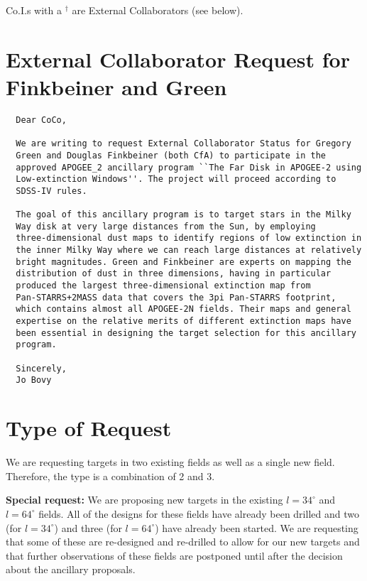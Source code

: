 \documentclass[12pt,preprint]{aastex}
\begin{document}
Co.I.s with a $^\dagger$ are External Collaborators (see below).

\section{External Collaborator Request for Finkbeiner and Green}

\begin{verbatim}
  Dear CoCo,

  We are writing to request External Collaborator Status for Gregory
  Green and Douglas Finkbeiner (both CfA) to participate in the
  approved APOGEE_2 ancillary program ``The Far Disk in APOGEE-2 using
  Low-extinction Windows''. The project will proceed according to
  SDSS-IV rules.

  The goal of this ancillary program is to target stars in the Milky
  Way disk at very large distances from the Sun, by employing
  three-dimensional dust maps to identify regions of low extinction in
  the inner Milky Way where we can reach large distances at relatively
  bright magnitudes. Green and Finkbeiner are experts on mapping the
  distribution of dust in three dimensions, having in particular
  produced the largest three-dimensional extinction map from
  Pan-STARRS+2MASS data that covers the 3pi Pan-STARRS footprint,
  which contains almost all APOGEE-2N fields. Their maps and general
  expertise on the relative merits of different extinction maps have
  been essential in designing the target selection for this ancillary
  program.

  Sincerely,
  Jo Bovy
\end{verbatim}

\section{Type of Request}

We are requesting targets in two existing fields as well as a single
new field. Therefore, the type is a combination of 2 and 3.

{\bf Special request:} We are proposing new targets in the existing
$l=34^\circ$ and $l=64^\circ$ fields. All of the designs for these
fields have already been drilled and two (for $l=34^\circ$) and three
(for $l=64^\circ$) have already been started. We are requesting that
some of these are re-designed and re-drilled to allow for our new
targets and that further observations of these fields are postponed
until after the decision about the ancillary proposals.
\end{document}
